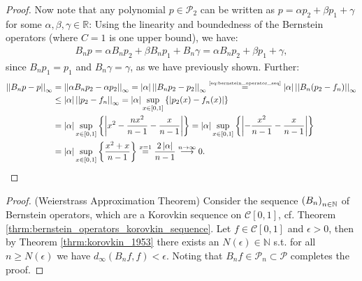 \begin{proof}
	Now note that any polynomial $p\in\mathcal P_2$ can be written as $p = \alpha p_2 + \beta p_1 + \gamma$ for some $\alpha, \beta, \gamma\in\mathbb R$: Using the linearity and boundedness of the Bernstein operators (where $C=1$ is one upper bound), we have:
	\begin{align}
		B_n p = \alpha B_n p_2 + \beta B_np_1 + B_n\gamma = \alpha B_n p_2 + \beta p_1 + \gamma,
	\end{align}
	since $B_n p_1 = p_1$ and $B_n\gamma = \gamma$, as we have previously shown. Further:
	\begin{align}
		\begin{split}
			\norm{B_n p - p}{\infty} &= \norm{\alpha B_np_2 - \alpha p_2}{\infty} = \abs{\alpha}\norm{B_n p_2 - p_2}{\infty} \overset{\tiny\eqref{eq:bernstein_operator_seq}}{=} \abs{\alpha}\norm{B_n(p_2 - f_n)}{\infty}
			\\ &\leq \abs{\alpha}\norm{p_2 - f_n}{\infty} = \abs{\alpha}\sup_{x\in[0, 1]}\left\{\abs{p_2(x) - f_n(x)}\right\} 
			\\ &= \abs{\alpha}\sup_{x\in[0, 1]}\left\{\abs{x^2 - \frac{nx^2}{n-1}- \frac{x}{n-1}}\right\} = \abs{\alpha}\sup_{x\in[0, 1]}\left\{\abs{- \frac{x^2}{n-1}- \frac{x}{n-1}}\right\}
			\\ &= \abs{\alpha}\sup_{x\in[0, 1]}\left\{ \frac{x^2 + x}{n-1} \right\} \overset{x=1}{=}\frac{2\abs{\alpha}}{n-1} \overset{n\to\infty}{\longrightarrow} 0.
		\end{split}
	\end{align}	 
\end{proof}

\begin{proof}(Weierstrass Approximation Theorem)
	Consider the sequence $\seq[B_n]$ of Bernstein operators, which are a Korovkin sequence on $\mathcal C[0, 1]$, cf. Theorem \ref{thrm:bernstein_operators_korovkin_sequence}. Let $f\in\mathcal C[0, 1]$ and $\epsilon > 0$, then by Theorem \ref{thrm:korovkin_1953} there exists an $N(\epsilon)\in\mathbb N$ s.t. for all $n\geq N(\epsilon)$ we have $d_{\infty}(B_nf, f) < \epsilon$. Noting that $B_nf\in\mathcal P_n\subset \mathcal P$ completes the proof.
\end{proof}
	
